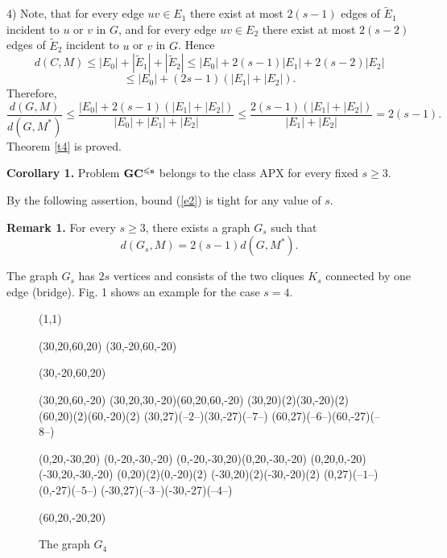 \documentclass[runningheads]{llncs}
\begin{document}
4) Note, that for every edge $uv \in E_1$ there exist at most $2(s-1)$ edges
of $\tilde{E}_1$ incident to $u$ or $v$ in $G$, 
and for every edge $uv \in E_2$ there exist at most $2(s-2)$ edges
of $\tilde{E}_2$ incident to $u$ or $v$ in $G$.
Hence 
$$
d(C,M) \leqslant |E_0| + |\tilde{E}_1| + |\tilde{E}_2| 
\leqslant |E_0| + 2(s-1)|E_1| + 2(s-2)|E_2|
$$ $$ 
\leqslant |E_0|+(2s-1)(|E_1| + |E_2|).
$$
Therefore,
$$
\frac{d(G,M)}{d(G,M^*)} 
\leqslant \frac{|E_0| + 2(s-1)(|E_1| + |E_2|)}{|E_0| + |E_1| + |E_2|} 
\leqslant \frac{2(s-1)(|E_1|+|E_2|)}{|E_1| + |E_2|} = 2(s-1).
$$
Theorem \ref{t4} is proved.

\medskip

{\bf Corollary 1.} Problem ${\bf GC^{\leqslant s}}$ belongs to the class APX
for every fixed $s \geqslant 3$.

\medskip

By the following assertion, bound (\ref{e2}) is tight for any value of $s$.

\medskip

{\bf Remark 1.} For every $s \geqslant 3$, there exists a graph $G_s$
such that
\begin{equation}\label{e8}
d(G_s,M) = 2(s-1)d(G,M^*).
\end{equation}

\medskip

The graph $G_s$ has $2s$ vertices and consists of
the two cliques $K_s$ connected by one edge (bridge). Fig. 1 shows an
example for the case $s = 4$.


\begin{figure}[htb]

\Draw%
\Scale(1,1)

\LineAt(30,20,60,20)
\LineAt(30,-20,60,-20)

\LineAt(30,-20,60,20)

\LineAt(30,20,60,-20)
\LineAt(30,20,30,-20)\LineAt(60,20,60,-20)
\MoveTo(30,20)\PaintCircle(2)\MoveTo(30,-20)\PaintCircle(2)
\MoveTo(60,20)\PaintCircle(2)\MoveTo(60,-20)\PaintCircle(2)
\MoveTo(30,27)\Text(--$2$--)\MoveTo(30,-27)\Text(--$7$--)
\MoveTo(60,27)\Text(--$6$--)\MoveTo(60,-27)\Text(--$8$--)


\LineAt(0,20,-30,20)
\LineAt(0,-20,-30,-20)
\LineAt(0,-20,-30,20)\LineAt(0,20,-30,-20)
\LineAt(0,20,0,-20) \LineAt(-30,20,-30,-20)
\MoveTo(0,20)\PaintCircle(2)\MoveTo(0,-20)\PaintCircle(2)
\MoveTo(-30,20)\PaintCircle(2)\MoveTo(-30,-20)\PaintCircle(2)
\MoveTo(0,27)\Text(--$1$--)\MoveTo(0,-27)\Text(--$5$--)
\MoveTo(-30,27)\Text(--$3$--)\MoveTo(-30,-27)\Text(--$4$--)

\LineAt(60,20,-20,20)%

\EndDraw \caption{The graph $G_4$}\label{f1}
\end{figure}
\end{document}
